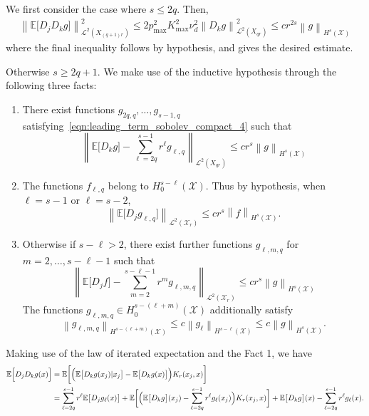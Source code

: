 \documentclass{article}
\newcommand{\norm}[1]{\left \lVert #1 \right \rVert}
\newcommand{\1}{\mathbf{1}}
\newcommand{\Xset}{\mathcal{X}}
\newcommand{\Leb}{\mathcal{L}}
\newcommand{\Ebb}{\mathbb{E}}
\theoremstyle{alden}
\theoremstyle{aldenthm}
\theoremstyle{definition}
\theoremstyle{remark}
\begin{document}
We first consider the case where $s \leq 2q$. Then,
\begin{align*}
\norm{\Ebb\bigl[D_jD_kg\bigr]}_{\Leb^2(X_{(q + 1)r})}^2 \leq 2 p_{\max}^2 K_{\max}^2 \nu_d^2 \norm{D_kg}_{\Leb^2(X_{qr})}^2 \leq c r^{2s} \norm{g}_{H^s(\Xset)}
\end{align*}
where the final inequality follows by hypothesis, and gives the desired estimate.

Otherwise $s \geq 2q + 1$. We make use of the inductive hypothesis through the following three facts:
\begin{enumerate}
	\item There exist functions $g_{2q,q}, \ldots, g_{s - 1,q}$ satisfying~\eqref{eqn:leading_term_sobolev_compact_4} such that
	\begin{equation*}
	\norm{\Ebb\bigl[D_kg\bigr] - \sum_{\ell = 2q}^{s - 1}r^{\ell}g_{\ell,q}}_{\Leb^2(X_{qr})} \leq c r^s \norm{g}_{H^s(\Xset)}
	\end{equation*}
	\item The functions $f_{\ell,q}$ belong to $H_0^{s - \ell}(\Xset)$. Thus by hypothesis, when $\ell = s - 1$ or $\ell = s - 2$,
	\begin{equation*}
	\norm{\Ebb\bigl[D_jg_{\ell,q}\bigr]}_{\Leb^2(\Xset_r)} \leq c r^s \norm{f}_{H^s(\Xset)}.
	\end{equation*}
	\item Otherwise if $s - \ell > 2$, there exist further functions $g_{\ell,m,q}$ for $m = 2,\ldots,s - \ell - 1$ such that
	\begin{equation*}
	\norm{\Ebb\bigl[D_jf\bigr] - \sum_{m = 2}^{s - \ell - 1}r^{m}g_{\ell,m,q}}_{\Leb^2(\Xset_r)} \leq  c r^s \norm{g}_{H^s(\Xset)}
	\end{equation*}
	The functions $g_{\ell,m,q} \in H_0^{s - (\ell + m)}(\Xset)$ additionally satisfy
	\begin{equation*}
	\norm{g_{\ell,m,q}}_{H^{s - (\ell + m)}(\Xset)} \leq c \norm{g_{\ell}}_{H^{s - \ell}(\Xset)} \leq c \norm{g}_{H^s(\Xset)}.
	\end{equation*}
\end{enumerate}
Making use of the law of iterated expectation and the Fact 1, we have
\begin{align}
\Ebb\Bigl[D_jD_kg(x)\Bigr] & = \Ebb\biggl[\Bigl(\Ebb\bigl[D_kg(x_j)|x_j\bigr] - \Ebb\bigl[D_kg(x)\bigr]\Bigr)K_r(x_j,x)\biggr] \nonumber \\
& = \sum_{\ell = 2q}^{s - 1} r^{\ell} \Ebb\bigl[D_jg_{\ell}(x)\bigr] + \Ebb\biggl[\Bigl(\Ebb\bigl[D_kg\bigr](x_j) - \sum_{\ell = 2q}^{s - 1}r^{\ell} g_{\ell}(x_j)\Bigr)K_r(x_j,x)\biggr] + \Ebb\bigl[D_kg\bigr](x) - \sum_{\ell = 2q}^{s - 1}r^{\ell} g_{\ell}(x). \label{eqn:leading_term_sobolev_compact_pf6}
\end{align}
\end{document}
